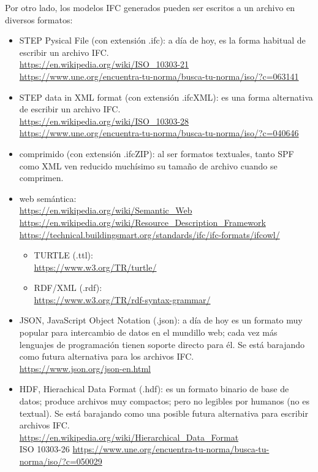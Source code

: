 \documentclass[spanish,10pt,a4paper,final,oneside]{article}
\begin{document}
Por otro lado, los modelos IFC generados pueden ser escritos a un archivo en diversos formatos:
\begin{itemize}
\item STEP Pysical File (con extensión .ifc): a día de hoy, es la forma habitual de escribir un archivo IFC. 
\\ \url{https://en.wikipedia.org/wiki/ISO_10303-21}
\\ \url{https://www.une.org/encuentra-tu-norma/busca-tu-norma/iso/?c=063141}
\item STEP data in XML format (con extensión .ifcXML): es una forma alternativa de escribir un archivo IFC.
\\ \url{https://en.wikipedia.org/wiki/ISO_10303-28}
\\ \url{https://www.une.org/encuentra-tu-norma/busca-tu-norma/iso/?c=040646}
\item comprimido (con extensión .ifcZIP): al ser formatos textuales, tanto SPF como XML ven reducido muchísimo su tamaño de archivo cuando se comprimen.
\item web semántica:
\\ \url{https://en.wikipedia.org/wiki/Semantic_Web}
\\ \url{https://en.wikipedia.org/wiki/Resource_Description_Framework}
\\ \url{https://technical.buildingsmart.org/standards/ifc/ifc-formats/ifcowl/}
\begin{itemize}
\item TURTLE (.ttl): 
\\ \url{https://www.w3.org/TR/turtle/}
\item RDF/XML (.rdf):
\\\url{https://www.w3.org/TR/rdf-syntax-grammar/}
\end{itemize}
\item JSON, JavaScript Object Notation (.json): a día de hoy es un formato muy popular para intercambio de datos en el mundillo web; cada vez más lenguajes de programación tienen soporte directo para él. Se está barajando como futura alternativa para los archivos IFC.
\\ \url{https://www.json.org/json-en.html}
\item HDF, Hierachical Data Format (.hdf): es un formato binario de base de datos; produce archivos muy compactos; pero no legibles por humanos (no es textual). Se está barajando como una posible futura alternativa para escribir  archivos IFC.
\\ \url{https://en.wikipedia.org/wiki/Hierarchical_Data_Format}
\\ ISO 10303-26 {\tiny \url{https://www.une.org/encuentra-tu-norma/busca-tu-norma/iso/?c=050029}}
\end{itemize}
\end{document}
